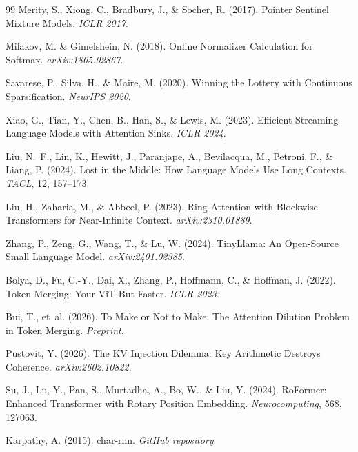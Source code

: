 \documentclass[11pt,a4paper]{article}
\begin{document}
\begin{thebibliography}{99}
Merity, S., Xiong, C., Bradbury, J., \& Socher, R. (2017).
\newblock Pointer Sentinel Mixture Models.
\newblock \emph{ICLR 2017}.

Milakov, M. \& Gimelshein, N. (2018).
\newblock Online Normalizer Calculation for Softmax.
\newblock \emph{arXiv:1805.02867}.

Savarese, P., Silva, H., \& Maire, M. (2020).
\newblock Winning the Lottery with Continuous Sparsification.
\newblock \emph{NeurIPS 2020}.

Xiao, G., Tian, Y., Chen, B., Han, S., \& Lewis, M. (2023).
\newblock Efficient Streaming Language Models with Attention Sinks.
\newblock \emph{ICLR 2024}.

Liu, N.~F., Lin, K., Hewitt, J., Paranjape, A., Bevilacqua, M., Petroni, F., \& Liang, P. (2024).
\newblock Lost in the Middle: How Language Models Use Long Contexts.
\newblock \emph{TACL}, 12, 157--173.

Liu, H., Zaharia, M., \& Abbeel, P. (2023).
\newblock Ring Attention with Blockwise Transformers for Near-Infinite Context.
\newblock \emph{arXiv:2310.01889}.

Zhang, P., Zeng, G., Wang, T., \& Lu, W. (2024).
\newblock TinyLlama: An Open-Source Small Language Model.
\newblock \emph{arXiv:2401.02385}.

Bolya, D., Fu, C.-Y., Dai, X., Zhang, P., Hoffmann, C., \& Hoffman, J. (2022).
\newblock Token Merging: Your ViT But Faster.
\newblock \emph{ICLR 2023}.

Bui, T., et~al. (2026).
\newblock To Make or Not to Make: The Attention Dilution Problem in Token Merging.
\newblock \emph{Preprint}.

Pustovit, Y. (2026).
\newblock The KV Injection Dilemma: Key Arithmetic Destroys Coherence.
\newblock \emph{arXiv:2602.10822}.

Su, J., Lu, Y., Pan, S., Murtadha, A., Bo, W., \& Liu, Y. (2024).
\newblock RoFormer: Enhanced Transformer with Rotary Position Embedding.
\newblock \emph{Neurocomputing}, 568, 127063.

Karpathy, A. (2015).
\newblock char-rnn.
\newblock \emph{GitHub repository}.

\end{thebibliography}
\end{document}
